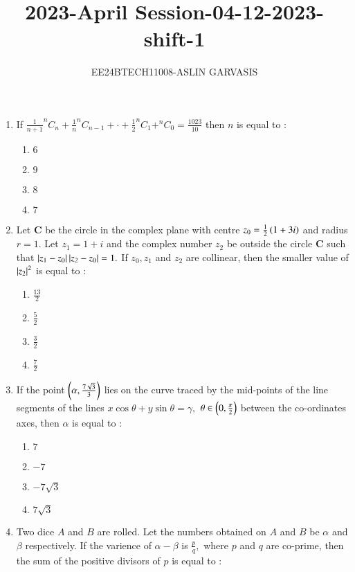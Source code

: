 \documentclass[journal,12pt,twocolumn]{IEEEtran}
\theoremstyle{remark}
\begin{document}

\vspace{3cm}
\title{2023-April Session-04-12-2023-shift-1}
\author{EE24BTECH11008-ASLIN GARVASIS}
\maketitle
\begin{enumerate}[start=16]
    \item If $\frac{1}{n+1}^nC_n+\frac{1}{n}^nC_{n-1}+\cdot+\frac{1}{2}^nC_1+^nC_0=\frac{1023}{10}$ then $n$ is equal to $:$\\
    \begin{enumerate}
        \item $6$
        \item $9$
        \item $8$
        \item $7$
    \end{enumerate}
    \item Let $\textbf{C}$ be the circle in the complex plane with centre $z_0=\frac{1}{2}\left(1+3i\right)$ and radius $r=1.$ Let $z_1=1+i$ and the complex number $z_2$ be outside the circle $\textbf{C}$ such that $\left\vert z_1-z_0\right\vert\left\vert z_2-z_0\right\vert=1.$ If $z_0,z_1$ and $z_2$ are collinear, then the smaller value of $\left\vert z_2\right\vert^2$ is equal to $:$\\
    \begin{enumerate}
        \item $\frac{13}{2}$
        \item $\frac{5}{2}$
        \item $\frac{3}{2}$
        \item $\frac{7}{2}$
    \end{enumerate}
    \item If the point $\left(\alpha,\frac{7\sqrt{3}}{3}\right)$ lies on the curve traced by the mid-points of the line segments of the lines $x\cos\theta+y\sin\theta=\gamma,$ $\theta\in \left(0,\frac{\pi}{2}\right)$ between the co-ordinates axes, then $\alpha$ is equal to $:$\\
    \begin{enumerate}
        \item $7$
        \item $-7$
        \item $-7\sqrt{3}$
        \item $7\sqrt{3}$
    \end{enumerate}
    \item Two dice $A$ and $B$ are rolled. Let the numbers obtained on $A$ and $B$ be $\alpha$ and $\beta$ respectively. If the varience of $\alpha-\beta$ is $\frac{p}{q},$ where $p$ and $q$ are co-prime, then the sum of the positive divisors of $p$ is equal to $:$\\

\end{enumerate}
\end{document}
